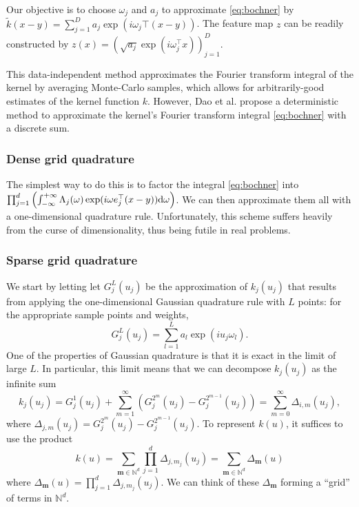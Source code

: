 \documentclass[conference]{IEEEtran}
\newcommand{\N}{\mathbb{N}}
\DeclareMathOperator{\1}{\mathbf{1}}
\theoremstyle{definition}
\begin{document}
Our objective is to choose $\omega_j$ and $a_j$ to approximate \ref{eq:bochner} by $\tilde{k}(x-y)=\sum_{j=1}^D a_j \exp(i\omega_j\top (x-y))$. The feature map $z$ can be readily constructed by $z(x)=(\sqrt{a_j}\exp(i\omega_j^\top x))_{j=1}^D$. 

This data-independent method approximates the Fourier transform integral of the kernel by averaging Monte-Carlo samples, which allows for arbitrarily-good estimates of the kernel function $k$.
However, Dao et al.\cite{GQKF} propose a deterministic method to approximate the kernel’s Fourier transform integral \ref{eq:bochner} with a discrete sum.

\subsubsection{Dense grid quadrature}
The simplest way to do this is to factor the integral \ref{eq:bochner} into $\prod_{j=1}^d \left(\int_{-\infty}^{+\infty}\Lambda_j(\omega) \exp(i\omega e_j^\top (x-y)) {\rm d}\omega\right)$. We can then approximate them all with a one-dimensional quadrature rule. Unfortunately, this scheme suffers heavily from the curse of dimensionality, thus being futile in real problems.


\subsubsection{Sparse grid quadrature}
We start by letting let $G_j^L(u_j)$ be the approximation of $k_j(u_j)$ that results
from applying the one-dimensional Gaussian quadrature rule with $L$ points: for
the appropriate sample points and weights,
\[
  G_j^L(u_j) = \sum_{l=1}^L a_l \exp(i u_j \omega_l).
\]
One of the properties of Gaussian quadrature is that it is exact in the limit of
large $L$.
In particular, this limit means that we can decompose $k_j(u_j)$ as the infinite
sum
\begin{equation*}
    k_j(u_j) = G_j^1(u_j) + \sum_{m=1}^{\infty} \left(G_j^{2^m}(u_j) - G_j^{2^{m-1}}(u_j) \right) =
    \sum_{m=0}^{\infty} \Delta_{i,m}(u_j),
  \end{equation*}
where $\Delta_{j,m}(u_j) = G_j^{2^m}(u_j) - G_j^{2^{m-1}}(u_j)$.
To represent $k(u)$, it suffices to use the product
\[
  k(u) = \sum_{\mathbf{m} \in \N^d} \prod_{j=1}^d \Delta_{j,m_j}(u_j) = \sum_{\mathbf{m} \in \N^d}
  \Delta_{\mathbf{m}}(u)
\]
where $\Delta_{\mathbf{m}}(u) = \prod_{j=1}^d \Delta_{j, m_j}(u_j)$.  We can think of these
$\Delta_{\mathbf{m}}$ forming a ``grid'' of terms in $\N^d$.  
\end{document}
